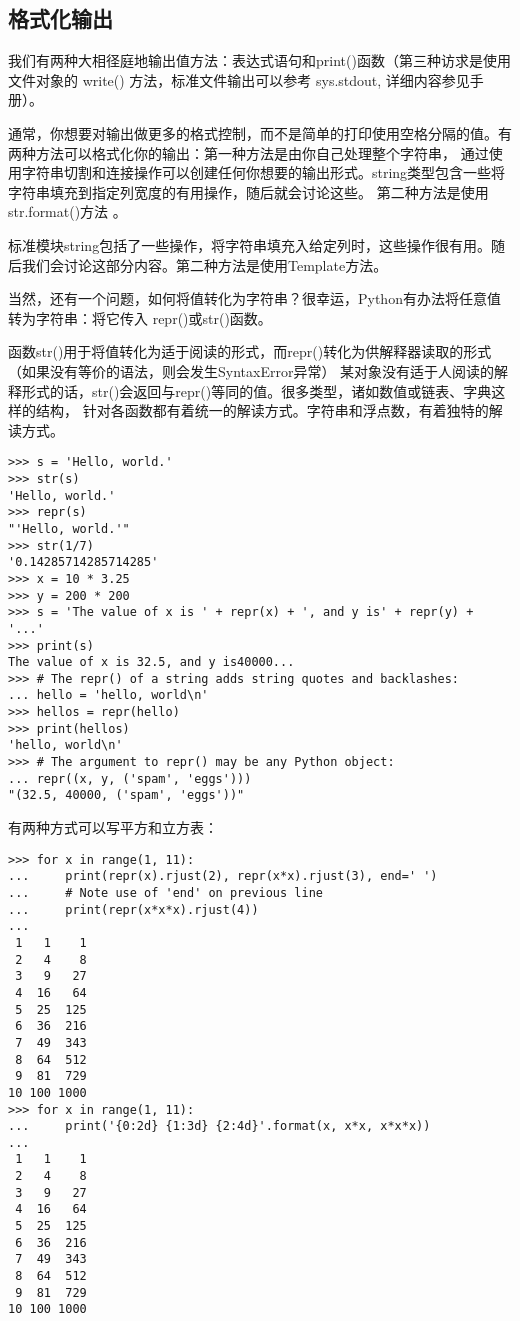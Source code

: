 \documentclass[UTF8]{ctexart}
\begin{document}
\subsection{格式化输出}
我们有两种大相径庭地输出值方法：表达式语句和print()函数（第三种访求是使用文件对象的 write() 方法，标准文件输出可以参考 sys.stdout,
详细内容参见手册）。

通常，你想要对输出做更多的格式控制，而不是简单的打印使用空格分隔的值。有两种方法可以格式化你的输出：第一种方法是由你自己处理整个字符串，
通过使用字符串切割和连接操作可以创建任何你想要的输出形式。string类型包含一些将字符串填充到指定列宽度的有用操作，随后就会讨论这些。
第二种方法是使用str.format()方法 。

标准模块string包括了一些操作，将字符串填充入给定列时，这些操作很有用。随后我们会讨论这部分内容。第二种方法是使用Template方法。

当然，还有一个问题，如何将值转化为字符串？很幸运，Python有办法将任意值转为字符串：将它传入 repr()或str()函数。

函数str()用于将值转化为适于阅读的形式，而repr()转化为供解释器读取的形式（如果没有等价的语法，则会发生SyntaxError异常）
某对象没有适于人阅读的解释形式的话，str()会返回与repr()等同的值。很多类型，诸如数值或链表、字典这样的结构，
针对各函数都有着统一的解读方式。字符串和浮点数，有着独特的解读方式。
\begin{verbatim}
>>> s = 'Hello, world.'
>>> str(s)
'Hello, world.'
>>> repr(s)
"'Hello, world.'"
>>> str(1/7)
'0.14285714285714285'
>>> x = 10 * 3.25
>>> y = 200 * 200
>>> s = 'The value of x is ' + repr(x) + ', and y is' + repr(y) + '...'
>>> print(s)
The value of x is 32.5, and y is40000...
>>> # The repr() of a string adds string quotes and backlashes:
... hello = 'hello, world\n'
>>> hellos = repr(hello)
>>> print(hellos)
'hello, world\n'
>>> # The argument to repr() may be any Python object:
... repr((x, y, ('spam', 'eggs')))
"(32.5, 40000, ('spam', 'eggs'))"
\end{verbatim}

有两种方式可以写平方和立方表：
\begin{verbatim}
>>> for x in range(1, 11):
...     print(repr(x).rjust(2), repr(x*x).rjust(3), end=' ')
...     # Note use of 'end' on previous line
...     print(repr(x*x*x).rjust(4))
...
 1   1    1
 2   4    8
 3   9   27
 4  16   64
 5  25  125
 6  36  216
 7  49  343
 8  64  512
 9  81  729
10 100 1000
>>> for x in range(1, 11):
...     print('{0:2d} {1:3d} {2:4d}'.format(x, x*x, x*x*x))
...
 1   1    1
 2   4    8
 3   9   27
 4  16   64
 5  25  125
 6  36  216
 7  49  343
 8  64  512
 9  81  729
10 100 1000
\end{verbatim}
\end{document}
